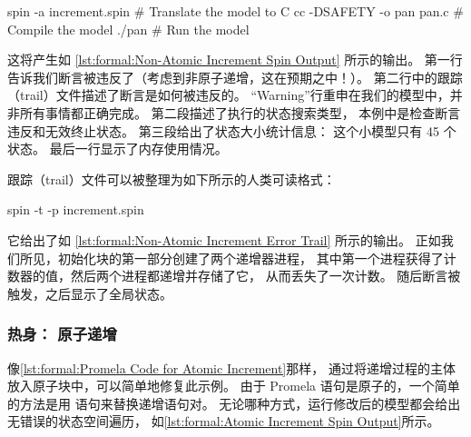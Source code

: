 \begin{VerbatimU}
spin -a increment.spin      # Translate the model to C
cc -DSAFETY -o pan pan.c    # Compile the model
./pan                       # Run the model
\end{VerbatimU}

\begin{listing}
\vspace*{-9pt}
\caption{非原子递增的 Spin 输出}
\label{lst:formal:Non-Atomic Increment Spin Output}
\end{listing}

这将产生如
\cref{lst:formal:Non-Atomic Increment Spin Output}
所示的输出。
第一行告诉我们断言被违反了（考虑到非原子递增，这在预期之中！）。
第二行中的跟踪（trail）文件描述了断言是如何被违反的。
``Warning''行重申在我们的模型中，并非所有事情都正确完成。
第二段描述了执行的状态搜索类型，
本例中是检查断言违反和无效终止状态。
第三段给出了状态大小统计信息：
这个小模型只有 45 个状态。
最后一行显示了内存使用情况。

跟踪（trail）文件可以被整理为如下所示的人类可读格式：

\begin{VerbatimU}
spin -t -p increment.spin
\end{VerbatimU}

\begin{listing*}
\IfEbookSize{\vspace*{7pt}}{\vspace*{-9pt}}
\caption{非原子递增错误轨迹}
\label{lst:formal:Non-Atomic Increment Error Trail}
\end{listing*}

它给出了如
\cref{lst:formal:Non-Atomic Increment Error Trail}
所示的输出。
正如我们所见，初始化块的第一部分创建了两个递增器进程，
其中第一个进程获得了计数器的值，然后两个进程都递增并存储了它，
从而丢失了一次计数。
随后断言被触发，之后显示了全局状态。

\subsubsection{热身：
			原子递增}
\label{sec:formal:Warm-Up: Atomic Increment}

像\cref{lst:formal:Promela Code for Atomic Increment}那样，
通过将递增过程的主体放入原子块中，可以简单地修复此示例。
由于 Promela 语句是原子的，一个简单的方法是用
 语句来替换递增语句对。
无论哪种方式，运行修改后的模型都会给出无错误的状态空间遍历，
如\cref{lst:formal:Atomic Increment Spin Output}所示。

